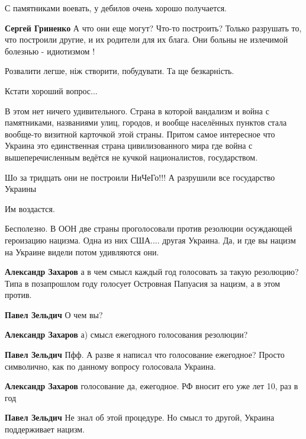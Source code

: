 \begin{itemize}
С памятниками воевать, у дебилов очень хорошо получается.

\begin{itemize} %
\textbf{Сергей Гриненко} А что они еще могут? Что-то построить? Только разрушать то, что построили другие, и их родители для их блага. Они больны не излечимой болезнью - идиотизмом !
\end{itemize} %

Розвалити легше, ніж створити, побудувати. Та ще безкарність.

Кстати хороший вопрос...


В этом нет ничего удивительного. Страна в которой вандализм и война с
памятниками, названиями улиц, городов, и вообще населённых пунктов стала
вообще-то визитной карточкой этой страны. Притом самое интересное что Украина
это единственная страна цивилизованного мира где война с вышеперечисленным
ведётся не кучкой националистов, государством.

Шо за тридцать они не построили НиЧеГо!!! А разрушили все государство Украины

Им воздастся.


Бесполезно. В ООН две страны проголосовали против резолюции осуждающей
героизацию нацизма. Одна из них США.... другая Украина. Да, и где вы нацизм на
Украине видели потом удивляются они.

\begin{itemize} %
\textbf{Александр Захаров} а в чем смысл каждый год голосовать за такую резолюцию? Типа в позапрошлом году голосует Островная Папуасия за нацизм, а в этом против.

\textbf{Павел Зельдич} О чем вы?

\textbf{Александр Захаров} а) смысл ежегодного голосования резолюции?

\textbf{Павел Зельдич} Пфф. А разве я написал что голосование ежегодное? Просто символично, как по данному вопросу голосовала Украина.

\textbf{Александр Захаров} голосование да, ежегодное. РФ вносит его уже лет 10, раз в год

\textbf{Павел Зельдич} Не знал об этой процедуре. Но смысл то другой, Украина поддерживает нацизм.
\end{itemize} %


\end{itemize}
